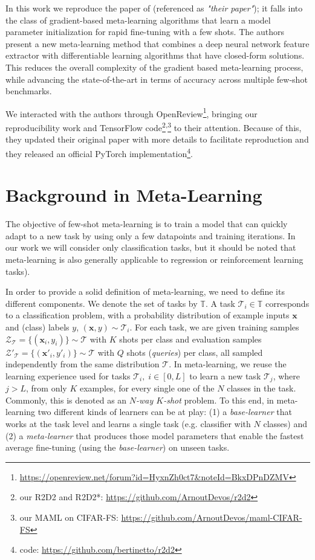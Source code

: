 In this work we reproduce the paper of \citet{R2D2} (referenced as \textit{"their paper"}); it falls into the class of gradient-based meta-learning algorithms that learn a model parameter initialization for rapid fine-tuning with a few shots\supercite{finn,reptile}. The authors present a new meta-learning method that combines a deep neural network feature extractor with differentiable learning algorithms that have closed-form solutions. This reduces the overall complexity of the gradient based meta-learning process, while advancing the state-of-the-art in terms of accuracy across multiple few-shot benchmarks.

We interacted with the authors through OpenReview\footnote{\url{https://openreview.net/forum?id=HyxnZh0ct7&noteId=BkxDPnDZMV}}, bringing our reproducibility work and TensorFlow code\footnote{our R2D2 and R2D2*: \url{https://github.com/ArnoutDevos/r2d2}}\textsuperscript{,}\footnote{our MAML on \textsc{CIFAR-FS}: \url{https://github.com/ArnoutDevos/maml-CIFAR-FS}} to their attention. Because of this, they updated their original paper with more details to facilitate reproduction and they released an official PyTorch implementation\footnote{\citet{R2D2} code: \url{https://github.com/bertinetto/r2d2}}.

\section{Background in Meta-Learning}
\label{related}
The objective of few-shot meta-learning is to train a model that can quickly adapt to a new task by using only a few datapoints and training iterations. In our work we will consider only classification tasks, but it should be noted that meta-learning is also generally applicable to regression or reinforcement learning tasks\supercite{finn}).

In order to provide a solid definition of meta-learning, we need to define its different components. We denote the set of tasks by $\mathbb{T}$. A task $\mathcal{T}_i \in \mathbb{T}$ corresponds to a classification problem, with a probability distribution of example inputs $\bm{x}$ and (class) labels $y$, $(\bm{x}, y) \sim\mathcal{T}_i$. For each task, we are given training samples $\mathcal{Z}_\mathcal{T}=\{ (\bm{x}_i,y_i) \} \sim \mathcal{T}$ with $K$ shots per class and evaluation samples $\mathcal{Z}'_\mathcal{T}=\{ (\bm{x}'_i,y'_i)\} \sim \mathcal{T}$ with $Q$ shots (\textit{queries}) per class, all sampled independently from the same distribution $\mathcal{T}$. In meta-learning, we reuse the learning experience used for tasks $\mathcal{T}_i, \; i\in [0, L]$ to learn a new task $\mathcal{T}_j$, where $j>L$, from only $K$ examples, for every single one of the $N$ classes in the task. Commonly, this is denoted as an \textit{$N$-way $K$-shot} problem. To this end, in meta-learning two different kinds of learners can be at play: (1) a \textit{base-learner} that works at the task level and learns a single task (e.g. classifier with $N$ classes) and (2) a \textit{meta-learner} that produces those model parameters that enable the fastest average fine-tuning (using the \textit{base-learner}) on unseen tasks.

